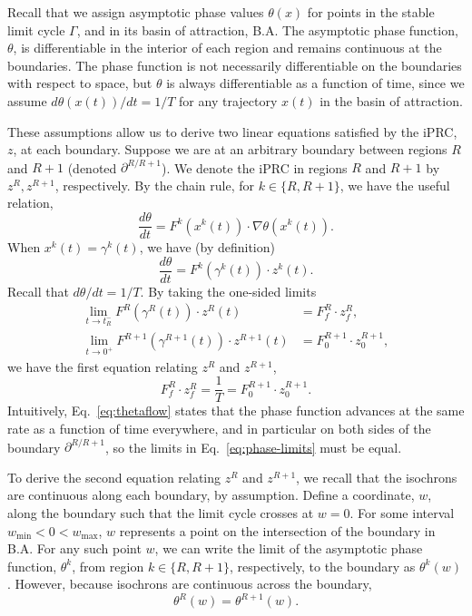 \documentclass[12pt]{article}
\newenvironment{proof}[1][Proof]{\begin{trivlist}
\item[\hskip \labelsep {\bfseries #1}]}{\end{trivlist}}
\begin{document}
\begin{proof}Recall that we assign asymptotic phase values $\theta(x)$ for points in the stable limit cycle $\Gamma$, and in its basin of attraction, B.A. The asymptotic phase function, $\theta$, is differentiable in the interior of each region and remains continuous at the boundaries.  The phase function is not necessarily differentiable on the boundaries with respect to space, but $\theta$ is always differentiable as a function of time, since we assume $d\theta(x(t))/dt = 1/T$ for any trajectory $x(t)$ in the basin of attraction.

These assumptions allow us to derive two linear equations satisfied by the iPRC, $z$, at each boundary.  Suppose we are at an arbitrary boundary between regions $R$ and $R+1$ (denoted $\partial^{R/R+1}$).  We denote the iPRC in regions $R$ and $R+1$ by $z^{R}, z^{R+1}$, respectively.  By the chain rule, for $k\in \{ R,R+1 \}$, we have the useful relation,
\begin{equation}
 \frac{d\theta}{dt}=F^{k}(x^{k}(t))\cdot\nabla\theta(x^{k}(t)).
\end{equation}
When $x^k(t) = \gamma^k(t)$, we have (by definition)
\begin{equation}
 \frac{d\theta}{dt} = F^{k}(\gamma^{k}(t))\cdot z^{k}(t).
\end{equation}
Recall that $d\theta/dt=1/T$. By taking the one-sided limits
\begin{equation}\label{eq:phase-limits}
 \begin{split}
  \lim_{t \rightarrow t_R^-} F^{R}(\gamma^{R}(t))\cdot z^R(t) &= F_f^{R}\cdot z_f^R,\\
  \lim_{t \rightarrow 0^+} F^{R+1}(\gamma^{R+1}(t))\cdot z^{R+1}(t) &= F_0^{R+1}\cdot z_0^{R+1},
  \end{split}
\end{equation}
we have the first equation relating $z^R$ and $z^{R+1}$,
\begin{equation}\label{eq:thetaflow}
F_f^{R}\cdot z_f^{R} = \frac{1}{T} = F_0^{R+1}\cdot z_0^{R+1}.
\end{equation}
Intuitively, Eq.~\eqref{eq:thetaflow} states that the phase function advances at the same rate as a function of time everywhere, and in particular on both sides of the boundary $\partial^{R/R+1}$, so the limits in Eq.~\ref{eq:phase-limits} must be equal.

To derive the second equation relating $z^R$ and $z^{R+1}$, we recall that the isochrons are continuous along each boundary, by assumption.  Define a coordinate, $w$, along the boundary such that the limit cycle crosses at $w=0$.  For some interval $w_{\text{min}}<0<w_{\text{max}}$, $w$ represents a point on the intersection of the boundary in B.A.  For any such point $w$, we can write the limit of the asymptotic phase function, $\theta^k$, from region $k \in \{ R,R+1 \}$, respectively, to the boundary as $\theta^k(w)$.  However, because isochrons are continuous across the boundary,
\begin{equation}
 \theta^R(w) = \theta^{R+1}(w).
\end{equation}



\end{proof}
\end{document}

